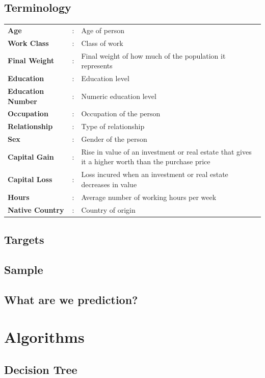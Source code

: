 \documentclass[12pt]{article}
\renewcommand{\arraystretch}{1.2}
\begin{document}
	\setlength{\arrayrulewidth}{0.0mm}
	\setlength{\tabcolsep}{15pt}
	\renewcommand{\arraystretch}{1.2}
	
	\subsection{Terminology}
	\begin{tabular}{|p{3cm}|p{1cm}|p{10cm}|}
		{\bfseries Age}&:&Age of person\\
		{\bfseries Work Class}&:&Class of work\\
		{\bfseries Final Weight}&:&Final weight of how much of the population it represents\\
		{\bfseries Education}&:&Education level\\
		{\bfseries Education Number}&:&Numeric education level\\
		{\bfseries Occupation}&:&Occupation of the person\\
		{\bfseries Relationship}&:&Type of relationship\\
		{\bfseries Sex}&:&Gender of the person\\
		{\bfseries Capital Gain}&:&Rise in value of an investment or real estate that gives it a higher worth than the purchase price\\
		{\bfseries Capital Loss}&:&Loss incured when an investment or real estate decreases in value\\
		{\bfseries Hours}&:&Average number of working hours per week\\
		{\bfseries Native Country}&:&Country of origin\\
	\end{tabular}
	
	\subsection{Targets}
	\subsection{Sample}
	\subsection{What are we prediction?}
	\newpage
	
	\section{Algorithms}
	\subsection{Decision Tree}
\end{document}

